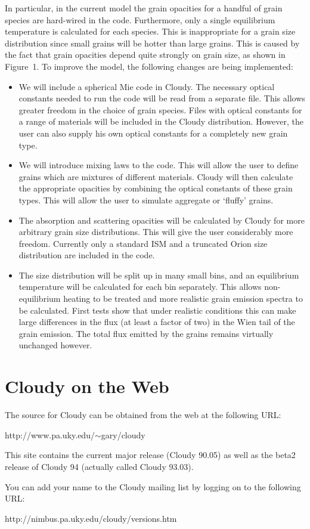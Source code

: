 In particular, in the current model the grain opacities for a handful of grain
species are hard-wired in the code. Furthermore, only a single equilibrium
temperature is calculated for each species. This is inappropriate for a grain
size distribution since small grains will be hotter than large grains. This is
caused by the fact that grain opacities depend quite strongly on grain size,
as shown in Figure~1. To improve the model, the following changes are being
implemented:

\begin{itemize}
\item
We will include a spherical Mie code in Cloudy. The necessary
optical constants needed to run the code will be read from a separate file.
This allows greater freedom in the choice of grain species. Files with
optical constants for a range of materials will be included in the Cloudy
distribution. However, the user can also supply his own optical constants for
a completely new grain type.
\item
We will introduce mixing laws to the code. This will allow the user to
define grains which are mixtures of different materials. Cloudy will then
calculate the appropriate opacities by combining the optical constants of
these grain types. This will allow the user to simulate aggregate or
`fluffy' grains.
\item
The absorption and scattering opacities will be calculated by Cloudy for more
arbitrary grain size distributions. This will give the user considerably more
freedom. Currently only a standard ISM and a truncated Orion size
distribution are included in the code.
\item
The size distribution will be split up in many small bins, and an equilibrium
temperature will be calculated for each bin separately. This allows
non-equilibrium heating to be treated and more realistic grain emission
spectra to be calculated. First tests show that under realistic conditions
this can make large differences in the flux (at least a factor of two) in the
Wien tail of the grain emission. The total flux emitted by the grains remains
virtually unchanged however.
\end{itemize}


\section{Cloudy on the Web}

The source for Cloudy can be obtained from the web at the following URL:

\begin{center}
http://www.pa.uky.edu/{$\sim$}gary/cloudy
\end{center}

This site contains the current major release (Cloudy 90.05) as well as the
beta2 release of Cloudy 94 (actually called Cloudy 93.03).

You can add your name to the Cloudy mailing list by logging on to the
following URL:

\begin{center}
http://nimbus.pa.uky.edu/cloudy/versions.htm
\end{center}


